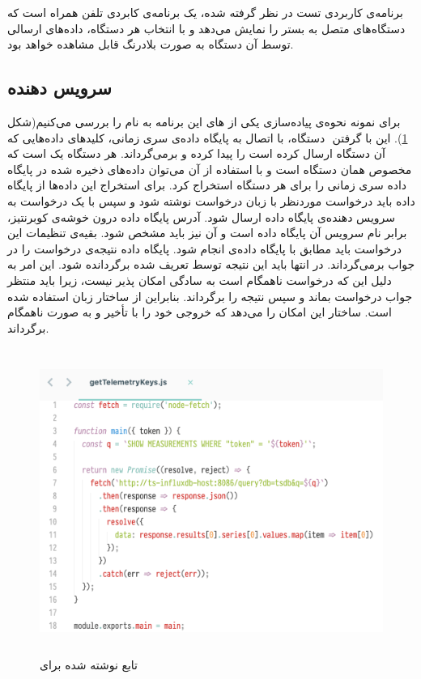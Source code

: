 برنامه‌ی کاربردی تست در نظر گرفته شده، یک برنامه‌ی کابردی تلفن همراه است که دستگاه‌های متصل به بستر را نمایش می‌دهد و با انتخاب هر دستگاه، داده‌های ارسالی توسط آن دستگاه به صورت بلادرنگ قابل مشاهده خواهد بود.

\subsection{سرویس دهنده}

برای نمونه نحوه‌ی پیاده‌سازی یکی از  های این برنامه به نام  را بررسی می‌کنیم(شکل \ref{action-file}). این  با گرفتن ‌ دستگاه، با اتصال به پایگاه داده‌ی سری زمانی، کلیدهای داده‌هایی که آن دستگاه ارسال کرده است را پیدا کرده و برمی‌گرداند.  هر دستگاه یک  است که مخصوص همان دستگاه است و با استفاده از آن می‌توان داده‌های ذخیره شده در پایگاه داده سری زمانی را برای هر دستگاه استخراج کرد. برای استخراج این داده‌ها از پایگاه داده باید درخواست موردنظر با زبان درخواست  نوشته شود و سپس با یک درخواست  به سرویس دهنده‌ی  پایگاه داده ارسال شود. آدرس پایگاه داده درون خوشه‌ی کوبرنتیز، برابر نام سرویس  آن پایگاه داده است و  آن نیز باید مشخص شود. بقیه‌ی تنظیمات این درخواست  باید مطابق با  پایگاه داده‌ی  انجام شود. پایگاه داده نتیجه‌ی درخواست را در جواب برمی‌گرداند. در انتها باید این نتیجه توسط  تعریف شده برگردانده شود. این امر به دلیل این که درخواست  ناهمگام است به سادگی امکان پذیر نیست، زیرا  باید منتظر جواب درخواست  بماند و سپس نتیجه را برگرداند. بنابراین از ساختار  زبان  استفاده شده است. ساختار  این امکان را می‌دهد که  خروجی خود را با تأخیر و به صورت ناهمگام برگرداند. 

\begin{figure}[!h]
	\centering
	\includegraphics[height=10cm]{images/action-file}
	\caption{تابع نوشته شده برای }
	\label{action-file}
\end{figure}

